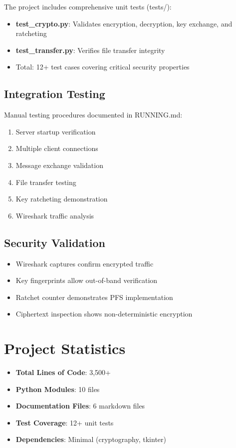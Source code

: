 \documentclass[12pt,a4paper]{article}
\begin{document}
The project includes comprehensive unit tests (tests/):

\begin{itemize}
    \item \textbf{test\_crypto.py}: Validates encryption, decryption, key exchange, and ratcheting
    \item \textbf{test\_transfer.py}: Verifies file transfer integrity
    \item Total: 12+ test cases covering critical security properties
\end{itemize}

\subsection{Integration Testing}

Manual testing procedures documented in RUNNING.md:

\begin{enumerate}
    \item Server startup verification
    \item Multiple client connections
    \item Message exchange validation
    \item File transfer testing
    \item Key ratcheting demonstration
    \item Wireshark traffic analysis
\end{enumerate}

\subsection{Security Validation}

\begin{itemize}
    \item Wireshark captures confirm encrypted traffic
    \item Key fingerprints allow out-of-band verification
    \item Ratchet counter demonstrates PFS implementation
    \item Ciphertext inspection shows non-deterministic encryption
\end{itemize}

\section{Project Statistics}

\begin{itemize}
    \item \textbf{Total Lines of Code}: 3,500+
    \item \textbf{Python Modules}: 10 files
    \item \textbf{Documentation Files}: 6 markdown files
    \item \textbf{Test Coverage}: 12+ unit tests
    \item \textbf{Dependencies}: Minimal (cryptography, tkinter)
\end{itemize}
\end{document}
